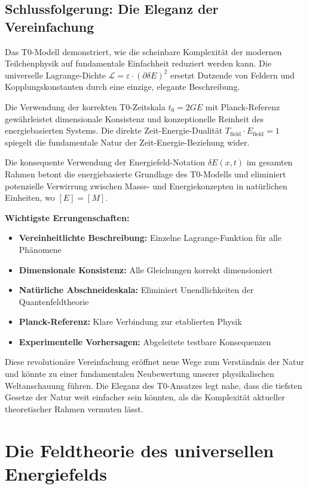 \documentclass[12pt,a4paper]{report}
\newcommand{\tzero}{t_0}                  %
\begin{document}
	\section{Schlussfolgerung: Die Eleganz der Vereinfachung}
	
	Das T0-Modell demonstriert, wie die scheinbare Komplexität der modernen Teilchenphysik auf fundamentale Einfachheit reduziert werden kann. Die universelle Lagrange-Dichte $\mathcal{L} = \varepsilon \cdot (\partial\delta E)^2$ ersetzt Dutzende von Feldern und Kopplungskonstanten durch eine einzige, elegante Beschreibung.
	
	Die Verwendung der korrekten T0-Zeitskala $\tzero = 2GE$ mit Planck-Referenz gewährleistet dimensionale Konsistenz und konzeptionelle Reinheit des energiebasierten Systems. Die direkte Zeit-Energie-Dualität $T_{\text{field}} \cdot E_{\text{field}} = 1$ spiegelt die fundamentale Natur der Zeit-Energie-Beziehung wider.
	
	Die konsequente Verwendung der Energiefeld-Notation $\delta E(x,t)$ im gesamten Rahmen betont die energiebasierte Grundlage des T0-Modells und eliminiert potenzielle Verwirrung zwischen Masse- und Energiekonzepten in natürlichen Einheiten, wo $[E] = [M]$.
	
	\textbf{Wichtigste Errungenschaften:}
	\begin{itemize}
		\item \textbf{Vereinheitlichte Beschreibung:} Einzelne Lagrange-Funktion für alle Phänomene
		\item \textbf{Dimensionale Konsistenz:} Alle Gleichungen korrekt dimensioniert
		\item \textbf{Natürliche Abschneideskala:} Eliminiert Unendlichkeiten der Quantenfeldtheorie
		\item \textbf{Planck-Referenz:} Klare Verbindung zur etablierten Physik
		\item \textbf{Experimentelle Vorhersagen:} Abgeleitete testbare Konsequenzen
	\end{itemize}
	
	Diese revolutionäre Vereinfachung eröffnet neue Wege zum Verständnis der Natur und könnte zu einer fundamentalen Neubewertung unserer physikalischen Weltanschauung führen. Die Eleganz des T0-Ansatzes legt nahe, dass die tiefsten Gesetze der Natur weit einfacher sein könnten, als die Komplexität aktueller theoretischer Rahmen vermuten lässt.
	\chapter{Die Feldtheorie des universellen Energiefelds}
	\label{chap:universal_field_theory}
	
\end{document}
